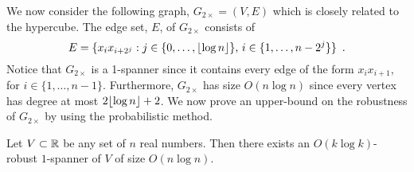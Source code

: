 \documentclass{cccg12}
\begin{document}
We now consider the following graph, $G_{2\times}=(V,E)$ which is
closely related to the hypercube.   The edge set, $E$, of $G_{2\times}$
consists of
\[
  E = \{x_ix_{i+2^j} : j\in\{0,\ldots,{\lfloor \log n \rfloor}\},\, 
        i\in\{1,\ldots,n-2^j\} \} \enspace .
\] 
Notice that $G_{2\times}$ is a 1-spanner since it contains every
edge of the form $x_ix_{i+1}$, for $i\in\{1,\ldots,n-1\}$. Furthermore,
$G_{2\times}$ has size $O(n\log n)$ since every vertex has degree at most
$2{\lfloor \log n \rfloor}+2$.  We now prove an upper-bound on the robustness of
$G_{2\times}$ by using the probabilistic method.

\begin{thm}
  Let $V\subset \mathbb{R}$ be any set of $n$ real numbers.  Then there exists
  an $O(k\log k)$-robust $1$-spanner of $V$ of size $O(n\log n)$.
\end{thm}
\end{document}
